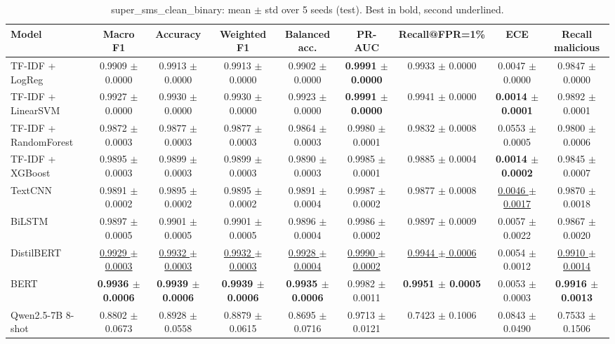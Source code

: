\begin{table}[t]
\centering
\small
\caption{super\_sms\_clean\_binary: mean $\pm$ std over 5 seeds (test). Best in bold, second underlined.}
\label{tab:super_sms_clean_binary}
\begin{tabular}{lcccccccc}
\toprule
Model & Macro F1 & Accuracy & Weighted F1 & Balanced acc. & PR-AUC & Recall@FPR=1\% & ECE & Recall malicious \\
\midrule
TF-IDF + LogReg & 0.9909 $\pm$ 0.0000 & 0.9913 $\pm$ 0.0000 & 0.9913 $\pm$ 0.0000 & 0.9902 $\pm$ 0.0000 & \textbf{0.9991 $\pm$ 0.0000} & 0.9933 $\pm$ 0.0000 & 0.0047 $\pm$ 0.0000 & 0.9847 $\pm$ 0.0000 \\
TF-IDF + LinearSVM & 0.9927 $\pm$ 0.0000 & 0.9930 $\pm$ 0.0000 & 0.9930 $\pm$ 0.0000 & 0.9923 $\pm$ 0.0000 & \textbf{0.9991 $\pm$ 0.0000} & 0.9941 $\pm$ 0.0000 & \textbf{0.0014 $\pm$ 0.0001} & 0.9892 $\pm$ 0.0001 \\
TF-IDF + RandomForest & 0.9872 $\pm$ 0.0003 & 0.9877 $\pm$ 0.0003 & 0.9877 $\pm$ 0.0003 & 0.9864 $\pm$ 0.0003 & 0.9980 $\pm$ 0.0001 & 0.9832 $\pm$ 0.0008 & 0.0553 $\pm$ 0.0005 & 0.9800 $\pm$ 0.0006 \\
TF-IDF + XGBoost & 0.9895 $\pm$ 0.0003 & 0.9899 $\pm$ 0.0003 & 0.9899 $\pm$ 0.0003 & 0.9890 $\pm$ 0.0003 & 0.9985 $\pm$ 0.0001 & 0.9885 $\pm$ 0.0004 & \textbf{0.0014 $\pm$ 0.0002} & 0.9845 $\pm$ 0.0007 \\
TextCNN & 0.9891 $\pm$ 0.0002 & 0.9895 $\pm$ 0.0002 & 0.9895 $\pm$ 0.0002 & 0.9891 $\pm$ 0.0004 & 0.9987 $\pm$ 0.0002 & 0.9877 $\pm$ 0.0008 & \underline{0.0046 $\pm$ 0.0017} & 0.9870 $\pm$ 0.0018 \\
BiLSTM & 0.9897 $\pm$ 0.0005 & 0.9901 $\pm$ 0.0005 & 0.9901 $\pm$ 0.0005 & 0.9896 $\pm$ 0.0004 & 0.9986 $\pm$ 0.0002 & 0.9897 $\pm$ 0.0009 & 0.0057 $\pm$ 0.0022 & 0.9867 $\pm$ 0.0020 \\
DistilBERT & \underline{0.9929 $\pm$ 0.0003} & \underline{0.9932 $\pm$ 0.0003} & \underline{0.9932 $\pm$ 0.0003} & \underline{0.9928 $\pm$ 0.0004} & \underline{0.9990 $\pm$ 0.0002} & \underline{0.9944 $\pm$ 0.0006} & 0.0054 $\pm$ 0.0012 & \underline{0.9910 $\pm$ 0.0014} \\
BERT & \textbf{0.9936 $\pm$ 0.0006} & \textbf{0.9939 $\pm$ 0.0006} & \textbf{0.9939 $\pm$ 0.0006} & \textbf{0.9935 $\pm$ 0.0006} & 0.9982 $\pm$ 0.0011 & \textbf{0.9951 $\pm$ 0.0005} & 0.0053 $\pm$ 0.0003 & \textbf{0.9916 $\pm$ 0.0013} \\
Qwen2.5-7B 8-shot & 0.8802 $\pm$ 0.0673 & 0.8928 $\pm$ 0.0558 & 0.8879 $\pm$ 0.0615 & 0.8695 $\pm$ 0.0716 & 0.9713 $\pm$ 0.0121 & 0.7423 $\pm$ 0.1006 & 0.0843 $\pm$ 0.0490 & 0.7533 $\pm$ 0.1506 \\
\bottomrule
\end{tabular}
\end{table}
